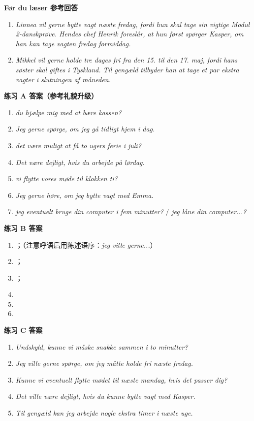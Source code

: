 \begin{answerbox}
\textbf{Før du læser 参考回答}
\begin{enumerate}
  \item \textit{Linnea vil gerne bytte vagt næste fredag, fordi hun skal tage sin vigtige Modul 2-danskprøve. Hendes chef Henrik foreslår, at hun først spørger Kasper, om han kan tage vagten fredag formiddag.}
  \item \textit{Mikkel vil gerne holde tre dages fri fra den 15. til den 17. maj, fordi hans søster skal giftes i Tyskland. Til gengæld tilbyder han at tage et par ekstra vagter i slutningen af måneden.}
\end{enumerate}

\textbf{练习 A 答案（参考礼貌升级）}
\begin{enumerate}
  \item \textit{ du  hjælpe mig med at bære kassen?}
  \item \textit{Jeg  gerne spørge, om jeg  gå tidligt hjem i dag.}
  \item \textit{ det være muligt at få to ugers ferie i juli?}
  \item \textit{Det  være dejligt, hvis du  arbejde på lørdag.}
  \item \textit{ vi  flytte vores møde til klokken ti?}
  \item \textit{Jeg  gerne høre, om jeg  bytte vagt med Emma.}
  \item \textit{ jeg eventuelt bruge din computer i fem minutter?} / \textit{ jeg låne din computer...?}
\end{enumerate}

\textbf{练习 B 答案}
\begin{enumerate}
  \item {}；（注意呼语后用陈述语序：\textit{jeg ville gerne...}）
  \item {}；
  \item {}；
  \item {}
  \item {}
  \item {}
\end{enumerate}

\textbf{练习 C 答案}
\begin{enumerate}
  \item \textit{Undskyld, kunne vi måske snakke sammen i to minutter?}
  \item \textit{Jeg ville gerne spørge, om jeg måtte holde fri næste fredag.}
  \item \textit{Kunne vi eventuelt flytte mødet til næste mandag, hvis det passer dig?}
  \item \textit{Det ville være dejligt, hvis du kunne bytte vagt med Kasper.}
  \item \textit{Til gengæld kan jeg arbejde nogle ekstra timer i næste uge.}
\end{enumerate}


\end{answerbox}
